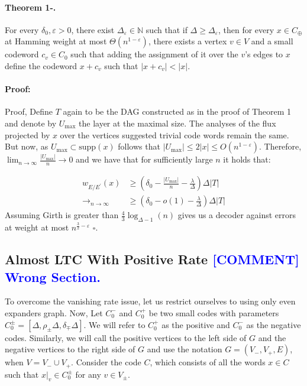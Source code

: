 \documentclass{article}
\newcommand{\commentt}[1]{\textcolor{blue}{ \textbf{[COMMENT]} #1}}
\newcommand{\ctt}[1]{\commentt{#1}}
\begin{document}
\begin{multicols*}{2}
  \paragraph{Theorem 1-.} For every $\delta_{0}, \varepsilon > 0$, there exist $\Delta_{\varepsilon}\in \mathbb{N}$ such that if $\Delta \ge \Delta_{\varepsilon}$, then for every $x \in C_{\oplus}$ at Hamming weight at most $ \Theta \left( n^{1-\varepsilon} \right) $, there exists a vertex $v \in V$ and a small codeword $c_{v} \in C_{0} $ such that adding the assignment of it over the $v$'s edges to $x$ define the codeword $x + c_{v}$  such that $|x + c_{v}| < |x|$.  
  \paragraph{Proof:} Proof, Define $T$ again to be the DAG constructed as in the proof of Theorem 1 and denote by $U_{\max}$ the layer at the maximal size. The analyses of the flux projected by $x$ over the vertices suggested trivial code words remain the same. But now, as $U_{\max} \subset \text{supp}(x)$ follows that $|U_{\max}| \le 2|x| \le O(n^{1-\varepsilon})$. Therefore, $ \lim_{n \rightarrow \infty} \frac{|U_{\max}|}{n} \rightarrow 0 $ and we have that for sufficiently large $n$ it holds that: 

  \begin{equation*}
    \begin{split}
      w_{E/E^{\prime}}\left( x \right) & \ge \left( \delta_{0} - \frac{|U_{\max}|}{n} - \frac{\lambda}{\Delta} \right) \Delta|T|  \\ 
      \rightarrow_{n \rightarrow \infty} &  \ge  \left( \delta_{0} - o(1)  - \frac{\lambda}{\Delta} \right) \Delta|T| 
    \end{split}
  \end{equation*}
  Assuming Girth is greater than $\frac{4}{3}\log_{\Delta-1}\left( n \right)$  gives us a decoder against errors at weight at most $n^{\frac{3}{2}-\varepsilon}$ $\square$. 


  \subsection{ Almost LTC With Positive Rate \ctt{ Wrong Section.  } } 
  To overcome the vanishing rate issue, let us restrict ourselves to using only even expanders graph. Now, Let $C_{0}^{-}$ and $C_{0}^{+}$ be two small codes with parameters $C_{0}^{\pm} = [\Delta, \rho_{\pm}\Delta, \delta_{\mp}\Delta]$. We will refer to $C_{0}^{+}$ as the positive and $C_{0}^{-}$ as the negative codes. Similarly, we will call the positive vertices to the left side of $G$ and the negative vertices to the right side of $G$ and use the notation $G = \left( V_{-}, V_{+}, E \right)$, when $V = V_{-} \cup V_{+}$. 
  Consider the code $C$, which consists of all the words $x\in C$ such that $x|_{v} \in C_{0}^{\pm}$ for any $v \in V_{\pm}$.

\end{multicols*}
\end{document}
